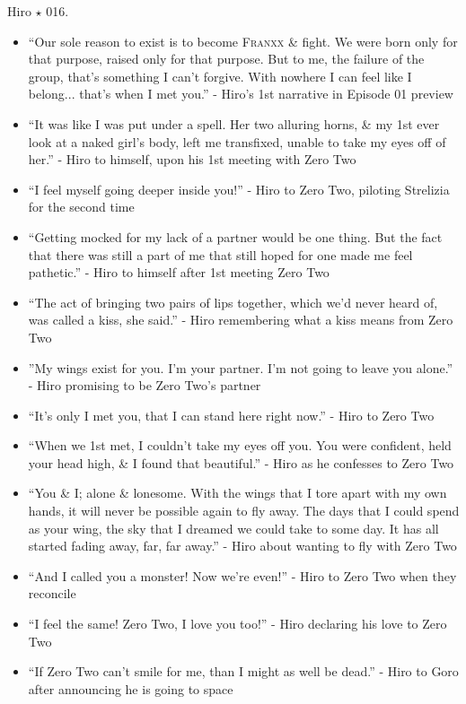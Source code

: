 \documentclass{article}
\begin{document}
\begin{enumerate}
    {\sc Hiro $\star$ 016.}
    \begin{itemize}
    	\item ``Our sole reason to exist is to become \textsc{Franxx} \& fight. We were born only for that purpose, raised only for that purpose. But to me, the failure of the group, that's something I can't forgive. With nowhere I can feel like I belong... that's when I met you.'' - Hiro's 1st narrative in Episode 01 preview
    	\item ``It was like I was put under a spell. Her two alluring horns, \& my 1st ever look at a naked girl's body, left me transfixed, unable to take my eyes off of her.'' - Hiro to himself, upon his 1st meeting with Zero Two
    	\item ``I feel myself going deeper inside you!'' - Hiro to Zero Two, piloting Strelizia for the second time
    	\item ``Getting mocked for my lack of a partner would be one thing. But the fact that there was still a part of me that still hoped for one made me feel pathetic.'' - Hiro to himself after 1st meeting Zero Two
    	\item ``The act of bringing two pairs of lips together, which we'd never heard of, was called a kiss, she said.'' - Hiro remembering what a kiss means from Zero Two
    	\item  ''My wings exist for you. I'm your partner. I'm not going to leave you alone.'' - Hiro promising to be Zero Two's partner
    	\item ``It's only I met you, that I can stand here right now.'' - Hiro to Zero Two
    	\item ``When we 1st met, I couldn't take my eyes off you. You were confident, held your head high, \& I found that beautiful.'' - Hiro as he confesses to Zero Two
    	\item ``You \& I; alone \& lonesome. With the wings that I tore apart with my own hands, it will never be possible again to fly away. The days that I could spend as your wing, the sky that I dreamed we could take to some day. It has all started fading away, far, far away.'' - Hiro about wanting to fly with Zero Two
    	\item ``And I called you a monster! Now we're even!'' - Hiro to Zero Two when they reconcile
    	\item ``I feel the same! Zero Two, I love you too!'' - Hiro declaring his love to Zero Two
    	\item ``If Zero Two can't smile for me, than I might as well be dead.'' - Hiro to Goro after announcing he is going to space

\end{itemize}
\end{enumerate}
\end{document}
